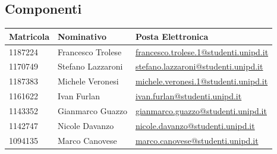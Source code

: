 \subsection{Componenti}
\begin{center}

	\begin{longtable}{p{4cm}|p{4cm}|p{6cm}}
		\arrayrulecolor{white}
		\hline
		\rowcolor{lighter-grayer}
		\textbf{Matricola}  &
		\textbf{Nominativo} &
		\textbf{Posta Elettronica}                                              \\
		\hline
		1187224             & Francesco Trolese & \href{mailto:francesco.trolese.1@studenti.unipd.it}{francesco.trolese.1@studenti.unipd.it} \\
		1170749             & Stefano Lazzaroni & \href{mailto:stefano.lazzaroni@studenti.unipd.it}{stefano.lazzaroni@studenti.unipd.it} \\
		1187383             & Michele Veronesi  & \href{mailto:michele.veronesi.1@studenti.unipd.it}{michele.veronesi.1@studenti.unipd.it}\\
		1161622             & Ivan Furlan       & \href{mailto:ivan.furlan@studenti.unipd.it}{ivan.furlan@studenti.unipd.it} \\
		1143352             & Gianmarco Guazzo  & \href{mailto:gianmarco.guazzo@studenti.unipd.it}{gianmarco.guazzo@studenti.unipd.it} \\
		1142747             & Nicole Davanzo    & \href{mailto:nicole.davanzo@studenti.unipd.it}{nicole.davanzo@studenti.unipd.it} \\
		1094135             & Marco Canovese    & \href{mailto:marco.canovese@studenti.unipd.it}{marco.canovese@studenti.unipd.it} \\
	\end{longtable}
\end{center}
